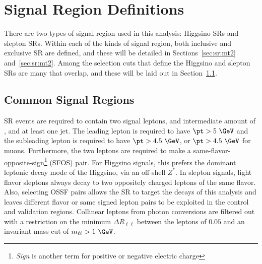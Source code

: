 \section{Signal Region Definitions}
\label{sec:sr:srdef}
 There are two types of signal region used in this analysis: Higgsino SRs and slepton SRs.  Within each of the kinds of signal region, both inclusive and exclusive SR are defined, and these will be detailed in Sections~\ref{sec:sr:mt2} and~\ref{sec:sr:mt2}.  Among the selection cuts that define the Higgsino and slepton SRs are many that overlap, and these will be laid out in Section~\ref{sec:sr:commom}.

\subsection{Common Signal Regions}
\label{sec:sr:commom}
SR events are required to contain two signal leptons, and intermediate amount of \met, and at least one jet.  The leading lepton is required to have $\pt > 5~\GeV$ and the subleading lepton is required to have $\pt > 4.5~\GeV$, or $\pt > 4.5~\GeV$ for muons.  Furthermore, the two leptons are required to make a same-flavor-opposite-sign\footnote{\textit{Sign} is another term for positive or negative electric charge} (SFOS) pair.  For Higgsino signals, this prefers the dominant leptonic decay mode of the Higgsino, via an off-shell $Z^*$.  In slepton signals, light flavor sleptons always decay to two oppositely charged leptons of the same flavor.  Also, selecting OSSF pairs allows the SR to target the decays of this analysis and leaves different flavor or same signed lepton pairs to be exploited in the control and validation regions.  Collinear leptons from photon conversions are filtered out with a restriction on the minimum $\Delta R_{\ell\ell}$ between the leptons of $0.05$ and an invariant mass cut of $m_{\ell\ell} > 1 ~\GeV$.  


